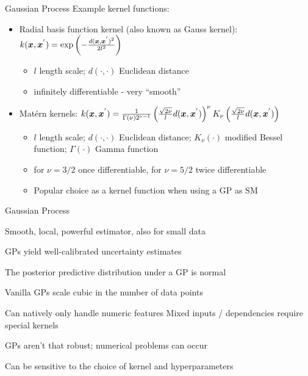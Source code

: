 \documentclass[11pt,compress,t,notes=noshow, xcolor=table]{beamer}
\begin{document}
\begin{framev}[fs=small]{Gaussian Process}
Example kernel functions:
\begin{itemize}
\item Radial basis function kernel (also known as Gauss kernel):
$k(\bm{x}, \bm{x}^{'})=\exp \left(-\frac{d(\bm{x}, \bm{x}^{'})^2}{2 l^2}\right)$
\begin{itemize}
\item $l$ length scale; $d(\cdot, \cdot)$ Euclidean distance
\item infinitely differentiable - very \enquote{smooth}
\end{itemize}
\item Matérn kernels:
$k(\bm{x}, \bm{x}^{'})=\frac{1}{\Gamma(\nu) 2^{\nu-1}}\left(\frac{\sqrt{2 \nu}}{l} d(\bm{x}, \bm{x}^{'})\right)^\nu K_\nu\left(\frac{\sqrt{2 \nu}}{l} d(\bm{x}, \bm{x}^{'})\right)$
\begin{itemize}
\item $l$ length scale; $d(\cdot, \cdot)$ Euclidean distance; $K_\nu(\cdot)$ modified Bessel function; $\Gamma(\cdot)$ Gamma function
\item for $\nu = 3/2$ once differentiable, for $\nu = 5/2$ twice differentiable
\item Popular choice as a kernel function when using a GP as SM
\end{itemize}
\end{itemize}
\end{framev}


\begin{framei}{Gaussian Process}
\item[Pros:]
\item Smooth, local, powerful estimator, also for small data
\item GPs yield well-calibrated uncertainty estimates
\item The posterior predictive distribution under a GP is normal
\spacer
\item[Cons:]
\item Vanilla GPs scale cubic in the number of data points
\item Can natively only handle numeric features
Mixed inputs / dependencies require special kernels
\item GPs aren't that robust; numerical problems can occur
\item Can be sensitive to the choice of kernel and hyperparameters
\end{framei}
\end{document}
